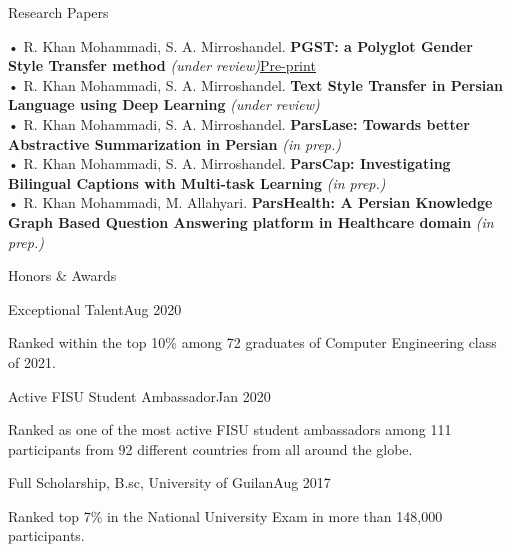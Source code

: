 \documentclass{resume} %
\begin{document}
\begin{rSection}{Research Papers}

• R. Khan Mohammadi, S. A. Mirroshandel. \textbf{PGST: a Polyglot Gender Style Transfer method} \emph{(under review)}\quad\underline{\href{https://www.dropbox.com/s/gjovh7gwemaox0g/PGST\%20Pre-print.pdf?dl=0}{Pre-print}}\\
• R. Khan Mohammadi, S. A. Mirroshandel. \textbf{Text Style Transfer in Persian Language using Deep Learning} \emph{(under review)}\\
• R. Khan Mohammadi, S. A. Mirroshandel. \textbf{ParsLase: Towards better Abstractive Summarization in Persian} \emph{(in prep.)}\\
• R. Khan Mohammadi, S. A. Mirroshandel. \textbf{ParsCap: Investigating Bilingual Captions with Multi-task Learning} \emph{(in prep.)} \\
• R. Khan Mohammadi, M. Allahyari. \textbf{ParsHealth: A Persian Knowledge Graph Based Question Answering platform in Healthcare domain} \emph{(in prep.)}

\end{rSection}


\begin{rSection}{Honors \& Awards}

\begin{rSubsection}{Exceptional Talent}{Aug 2020}{}{}
\item Ranked within the top 10\% among 72 graduates of Computer Engineering class of 2021.
\end{rSubsection}

\begin{rSubsection}{Active FISU Student Ambassador}{Jan 2020}{}{}
\item Ranked as one of the most active FISU student ambassadors among 111 participants from 92 different countries from all around the globe.
\end{rSubsection}


\begin{rSubsection}{Full Scholarship, B.sc, University of Guilan}{Aug 2017}{}{}
\item Ranked top 7\% in the National University Exam in more than 148,000 participants.
\end{rSubsection}

\end{rSection}
\end{document}
